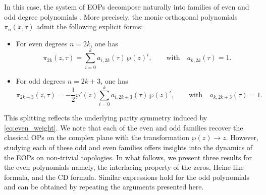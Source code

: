 \documentclass[11pt,a4paper]{article}
\theoremstyle{definition}
\numberwithin{equation}{section}
\numberwithin{theorem}{section}
\begin{document}


In this case, the system of EOPs decompose naturally into families of even and odd degree polynomials \cite{DLR24}.
More precisely, the monic orthogonal polynomials \( \pi_n(x, \tau) \) admit the following explicit forms:
\begin{itemize}
    \item For even degrees \( n = 2k \), one has
    \begin{equation}
       \pi_{2k}(z,\tau) = \sum_{i=0}^k a_{i,2k}(\tau)\, \wp(z)^i, \qquad \text{with} \quad a_{k,2k}(\tau) = 1.
    \end{equation}

    \item For odd degrees \( n = 2k+3 \), one has
    \begin{equation}
      \pi_{2k+3}(z,\tau) = -\frac{1}{2} \wp'(z) \sum_{i=0}^k a_{i,2k+3}(\tau)\, \wp(z)^i, \qquad \text{with} \quad a_{k,2k+3}(\tau) = 1.
    \end{equation}
\end{itemize}
This splitting reflects the underlying parity symmetry induced by \eqref{eq:even_weight}. We note that each of the even and odd families recover the classical OPs on the complex plane with the transformation $\wp(z) \to z$. However, studying each of these odd and even families offers insights into the dynamics of the EOPs on non-trivial topologies. In what follows, we present three results for the even polynomials namely, the interlacing property of the zeros, Heine like formula, and the CD formula. Similar expressions hold for the odd polynomials and can be obtained by repeating the arguments presented here.
\end{document}
